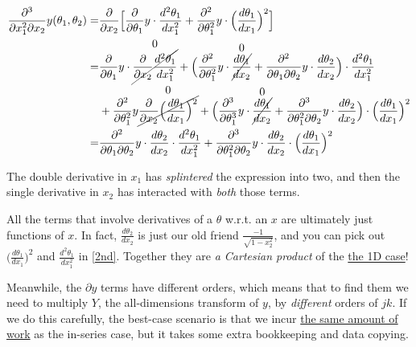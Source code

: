 \documentclass[10pt]{article}
\begin{document}
\begin{align*}
\frac{\partial^3}{\partial x_1^2 \partial x_2} y(\theta_1, \theta_2) =& \frac{\partial}{\partial x_2} \Big[ \frac{\partial}{\partial \theta_1} y \cdot \frac{d^2 \theta_1}{dx_1^2} + \frac{\partial^2}{\partial \theta_1^2} y \cdot \Big( \frac{d \theta_1}{dx_1} \Big)^2 \Big]\\
=& \frac{\partial}{\partial \theta_1} y \cdot \overset{\text{\normalsize 0}}{\cancel{\frac{\partial}{\partial x_2} \frac{d^2 \theta_1}{dx_1^2}}} + \Big( \frac{\partial^2}{\partial \theta_1^2} y \cdot \overset{\text{\normalsize 0}}{\cancel{\frac{d\theta_1}{dx_2}}} + \frac{\partial^2}{\partial \theta_1 \partial \theta_2} y \cdot \frac{d \theta_2}{dx_2} \Big) \cdot \frac{d^2\theta_1}{dx_1^2} \\
&+ \frac{\partial^2}{\partial \theta_1^2} y \overset{\text{\normalsize 0}}{\cancel{\frac{\partial}{\partial x_2} \Big( \frac{d\theta_1}{dx_1} \Big)^2}} + \Big( \frac{\partial^3}{\partial \theta_1^3} y \cdot \overset{\text{\normalsize 0}}{\cancel{\frac{d\theta_1}{dx_2}}} + \frac{\partial^3}{\partial \theta_1^2 \partial \theta_2} y \cdot \frac{d \theta_2}{dx_2} \Big) \cdot \Big(\frac{d\theta_1}{dx_1}\Big)^2 \\
=& \frac{\partial^2}{\partial \theta_1 \partial \theta_2} y \cdot \frac{d \theta_2}{dx_2} \cdot \frac{d^2\theta_1}{dx_1^2} + \frac{\partial^3}{\partial \theta_1^2 \partial \theta_2} y \cdot \frac{d \theta_2}{dx_2} \cdot \Big(\frac{d\theta_1}{dx_1}\Big)^2
\end{align*}

The double derivative in $x_1$ has \textit{splintered} the expression into two, and then the single derivative in $x_2$ has interacted with \textit{both} those terms.

All the terms that involve derivatives of a $\theta$ w.r.t. an $x$ are ultimately just functions of $x$. In fact, $\frac{d\theta_2}{dx_2}$ is just our old friend $\frac{-1}{\sqrt{1-x_2^2}}$, and you can pick out $\big( \frac{d\theta_1}{dx_1} \big)^2$ and $\frac{d^2\theta_1}{dx_1^2}$ in \autoref{2nd}. Together they are \textit{a Cartesian product} of the \hyperref[pyramid]{the 1D case}!

Meanwhile, the $\partial y$ terms have different orders, which means that to find them we need to multiply $Y$, the all-dimensions transform of $y$, by \textit{different} orders of $jk$. If we do this carefully, the best-case scenario is that we incur \href{https://github.com/pavelkomarov/spectral-derivatives/issues/2}{the same amount of work} as the in-series case, but it takes some extra bookkeeping and data copying.
\end{document}
